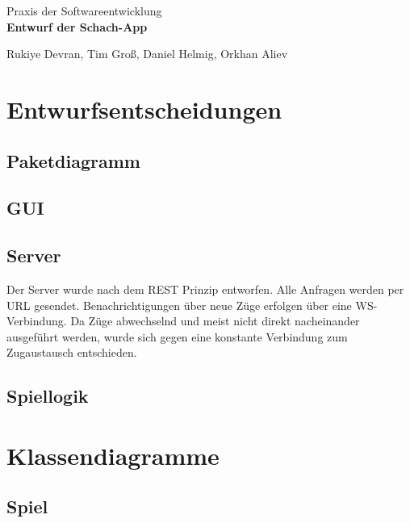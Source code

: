 \documentclass[parskip=full]{scrartcl}
\begin{document}
	\begin{titlepage}
			
		\centering
		\vspace*{0.2\textheight}
		{\Large Praxis der Softwareentwicklung}\\[\baselineskip]
		\vspace{2cm}
		{\Huge \textbf{Entwurf der Schach-App}}\\[\baselineskip]\par
		\vspace{2cm}
		{\LARGE Rukiye Devran, Tim Groß, Daniel Helmig, Orkhan Aliev}\par		
		\newpage	
		\tableofcontents
		\pagebreak
		
	\end{titlepage}
	\section{Entwurfsentscheidungen}
		\subsection{Paketdiagramm}
		
		\subsection{\gls{GUI}}
		
		\subsection{Server}
		Der Server wurde nach dem \gls{REST} Prinzip entworfen. Alle Anfragen werden per \gls{URL} gesendet. Benachrichtigungen über neue Züge erfolgen über eine \gls{WS}-Verbindung. Da Züge abwechselnd und meist nicht direkt nacheinander ausgeführt werden, wurde sich gegen eine konstante Verbindung zum Zugaustausch entschieden.
		
		\subsection{Spiellogik}
	\section{Klassendiagramme}
	
		\subsection{Spiel}
		
\end{document}
